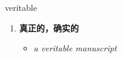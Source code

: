 
\begin{frame}
{\huge veritable}
\begin{center}
\begin{enumerate}\Large
  \item \textbf{真正的，确实的}
  \begin{itemize}
    \item \em{\Large{a veritable manuscript}}
  \end{itemize}
\end{enumerate}
\end{center}
\end{frame}
